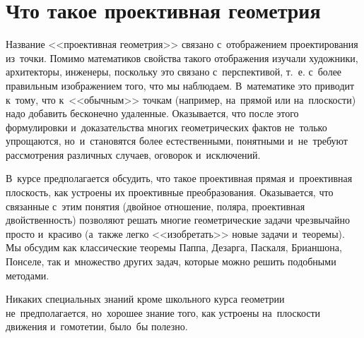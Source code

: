 
\section*{Что такое проективная геометрия}



Название <<проективная геометрия>> связано с~отображением проектирования
из~точки.
Помимо математиков свойства такого отображения изучали художники, архитекторы,
инженеры, поскольку это связано с~перспективой, т.~е. с~более правильным
изображением того, что мы наблюдаем.
В математике это приводит к~тому, что к~<<обычным>> точкам (например, на~прямой
или на~плоскости) надо добавить бесконечно удаленные.
Оказывается, что после этого формулировки и~доказательства многих
геометрических фактов не~только упрощаются, но~и~становятся более
естественными, понятными и~не~требуют рассмотрения различных случаев, оговорок
и~исключений.

В~курсе предполагается обсудить, что такое проективная прямая и~проективная
плоскость, как устроены их проективные преобразования.
Оказывается, что связанные с~этим понятия (двойное отношение, поляра,
проективная двойственность) позволяют решать многие геометрические задачи
чрезвычайно просто и~красиво (а~также легко <<изобретать>> новые задачи
и~теоремы).
Мы обсудим как классические теоремы Паппа, Дезарга, Паскаля, Брианшона,
Понселе, так и~множество других задач, которые можно решить подобными методами.

Никаких специальных знаний кроме школьного курса геометрии не~предполагается,
но~хорошее знание того, как устроены на~плоскости движения и~гомотетии, было~бы
полезно.

